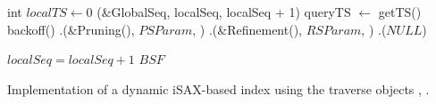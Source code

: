 {\begin{algorithm}[htbp]
\begin{algorithmic}[1]
    \vspace*{1mm}
    
     \label{alg:QueryAnswering}
        \State int $\mathit{localTS} \gets 0$
                    \State \CAS(\&GlobalSeq, localSeq, localSeq + 1)
                \EndIf
                \State queryTS $\gets$ getTS()
                    \State backoff()
                \EndWhile
            \EndIf
            \State \PS.\Traverse(\&Pruning(), $\mathit{PSParam}$, \False)
            \State \RS.\Traverse(\&Refinement(), $\mathit{RSParam}$, \False)
            \State \RS.\Clean($\mathit{NULL}$) \label{alg:reuseRS}
            
                \State $\mathit{localSeq} = \mathit{localSeq} + 1$            
            \EndIf
        \EndWhile
        \State \Return $\mathit{BSF}$
    \EndProcedure
    

    
    \end{algorithmic}
    
    \caption{Implementation of a dynamic iSAX-based index using the traverse objects \BC, \TP.}
    \label{alg:DynamiciTraverseObject}
    \end{algorithm}
}
